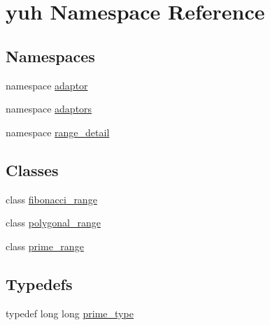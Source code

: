 \hypertarget{namespaceyuh}{\section{yuh \-Namespace \-Reference}
\label{d5/d2b/namespaceyuh}
}
\subsection*{\-Namespaces}
\begin{DoxyCompactItemize}
\item 
namespace \hyperlink{namespaceyuh_1_1adaptor}{adaptor}
\item 
namespace \hyperlink{namespaceyuh_1_1adaptors}{adaptors}
\item 
namespace \hyperlink{namespaceyuh_1_1range__detail}{range\-\_\-detail}
\end{DoxyCompactItemize}
\subsection*{\-Classes}
\begin{DoxyCompactItemize}
\item 
class \hyperlink{classyuh_1_1fibonacci__range}{fibonacci\-\_\-range}
\item 
class \hyperlink{classyuh_1_1polygonal__range}{polygonal\-\_\-range}
\item 
class \hyperlink{classyuh_1_1prime__range}{prime\-\_\-range}
\end{DoxyCompactItemize}
\subsection*{\-Typedefs}
\begin{DoxyCompactItemize}
\item 
typedef long long \hyperlink{namespaceyuh_af542f8440602da42322ddb7ea8242336}{prime\-\_\-type}
\end{DoxyCompactItemize}
